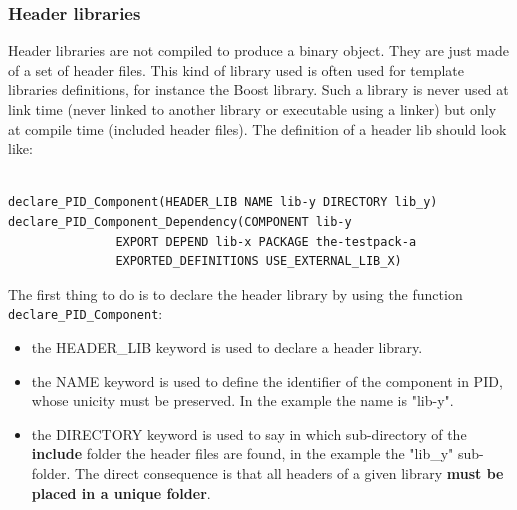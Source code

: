 \documentclass[12pt,a4paper]{article}
\begin{document}
\subsubsection{Header libraries}
\label{sec:libCMakeHeader}

Header libraries are not compiled to produce a binary object. They are just made of a set of header files. This kind of library used is often used for template libraries definitions, for instance the Boost library. Such a library is never used at link time (never linked to another library or executable using a linker) but only at compile time (included header files). The definition of a header lib should look like:
\begin{verbatim}

declare_PID_Component(HEADER_LIB NAME lib-y DIRECTORY lib_y)
declare_PID_Component_Dependency(COMPONENT lib-y 
               EXPORT DEPEND lib-x PACKAGE the-testpack-a
               EXPORTED_DEFINITIONS USE_EXTERNAL_LIB_X)

\end{verbatim}

The first thing to do is to declare the header library by using the function \texttt{declare\_PID\_Component}:
\begin{itemize}
\item the HEADER\_LIB keyword is used to declare a header library.
\item the NAME keyword is used to define the identifier of the component in PID, whose unicity must be preserved. In the example the name is "lib-y".
\item the DIRECTORY keyword is used to say in which sub-directory of the \textbf{include} folder the header files are found, in the example the "lib\_y" sub-folder. The direct consequence is that all headers of a given library \textbf{must be placed in a unique folder}.
\end{itemize}
 
\end{document}
